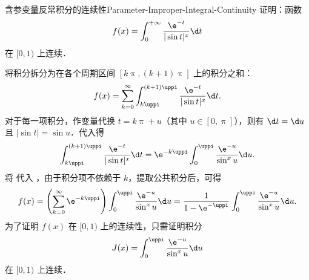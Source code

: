 \begin{problem}{含参变量反常积分的连续性}{Parameter-Improper-Integral-Continuity}
    证明：函数
    \begin{equation}\label{eq:q10-def-1}
        f(x) = \int_0^{+\infty} \frac{\e^{-t}}{|\sin t|^x} \d t
    \end{equation}
    在 $[0, 1)$ 上连续．
\end{problem}

\begin{myproof}
    将积分拆分为在各个周期区间 $[k\uppi, (k+1)\uppi]$ 上的积分之和：
    \begin{equation}\label{eq:q10-split-2}
        f(x) = \sum_{k=0}^{\infty} \int_{k\uppi}^{(k+1)\uppi} \frac{\e^{-t}}{|\sin t|^x} \d t.
    \end{equation}
    对于每一项积分，作变量代换 $t = k\uppi + u$（其中 $u \in [0, \uppi]$），则有 $\d t = \d u$ 且 $|\sin t| = \sin u$．代入得
    \begin{equation}\label{eq:q10-term-3}
        \int_{k\uppi}^{(k+1)\uppi} \frac{\e^{-t}}{|\sin t|^x} \d t = \e^{-k\uppi} \int_0^{\uppi} \frac{\e^{-u}}{\sin^x u} \d u.
    \end{equation}
    将  代入 ，由于积分项不依赖于 $k$，提取公共积分后，可得
    \begin{equation}\label{eq:q10-factor-4}
        f(x) = \left( \sum_{k=0}^{\infty} \e^{-k\uppi} \right) \int_0^{\uppi} \frac{\e^{-u}}{\sin^x u} \d u = \frac{1}{1 - \e^{-\uppi}} \int_0^{\uppi} \frac{\e^{-u}}{\sin^x u} \d u.
    \end{equation}
    为了证明 $f(x)$ 在 $[0, 1)$ 上的连续性，只需证明积分
    \begin{equation}\label{eq:q10-J-5}
        J(x) = \int_0^{\uppi} \frac{\e^{-u}}{\sin^x u} \d u
    \end{equation}
    在 $[0, 1)$ 上连续．


\end{myproof}
